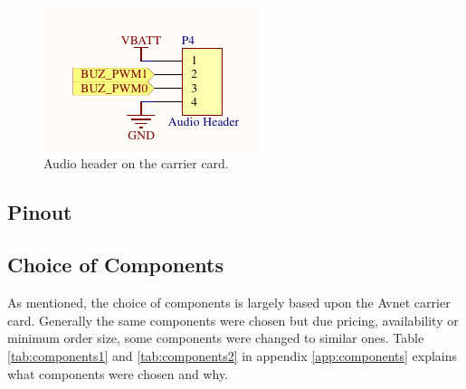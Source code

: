 \begin{figure}[h]
	\centering
	\includegraphics[width=0.4\linewidth]{graphics/audio_header.pdf}
	\caption{Audio header on the carrier card.}
	\label{fig:audio_header}
\end{figure}

\subsection{Pinout}


\subsection{Choice of Components}
As mentioned, the choice of components is largely based upon the Avnet carrier card.
Generally the same components were chosen but due pricing, availability or minimum order size, some components were changed to similar ones.
Table \ref{tab:components1} and \ref{tab:components2} in appendix \ref{app:components} explains what components were chosen and why.

